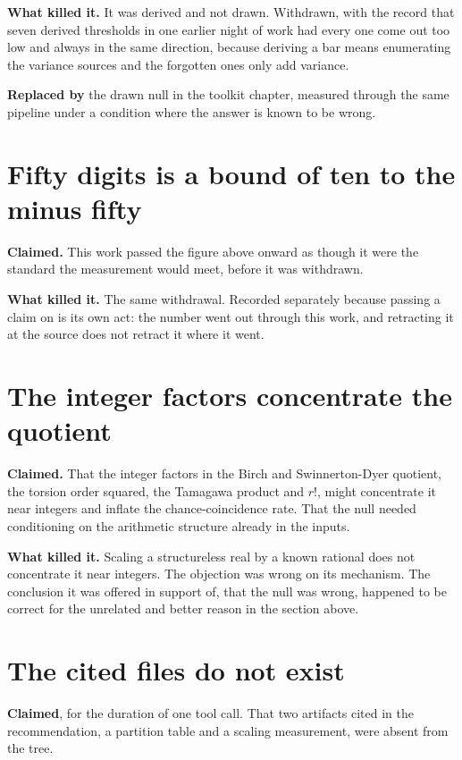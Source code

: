 \textbf{What killed it.} It was derived and not drawn. Withdrawn, with the record
that seven derived thresholds in one earlier night of work had every one come out too low and always in
the same direction, because deriving a bar means enumerating the variance sources and the forgotten
ones only add variance.

\textbf{Replaced by} the drawn null in the toolkit chapter, measured through the same pipeline under
a condition where the answer is known to be wrong.

\section{Fifty digits is a bound of ten to the minus fifty}

\textbf{Claimed.} This work passed the figure above onward as though it were the standard the
measurement would meet, before it was withdrawn.

\textbf{What killed it.} The same withdrawal. Recorded separately because passing a claim on is its
own act: the number went out through this work, and retracting it at the source does
not retract it where it went.

\section{The integer factors concentrate the quotient}

\textbf{Claimed.} That the integer factors in the Birch and Swinnerton-Dyer quotient, the torsion
order squared, the Tamagawa product and $r!$, might concentrate it near integers and inflate the
chance-coincidence rate. That the null needed conditioning on the arithmetic structure already
in the inputs.

\textbf{What killed it.} Scaling a structureless real by a known rational does not concentrate it
near integers. The objection was wrong on its mechanism. The conclusion it was offered in support
of, that the null was wrong, happened to be correct for the unrelated and better reason in the
section above.

\section{The cited files do not exist}

\textbf{Claimed}, for the duration of one tool call. That two artifacts cited in the recommendation,
a partition table and a scaling measurement, were absent from the tree.

